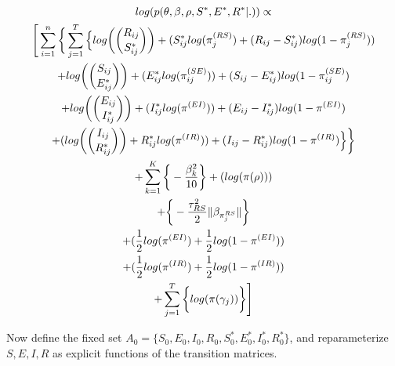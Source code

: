 \documentclass[12pt]{article}
\begin{document}
\begin{center}
\begin{multline}
\displaystyle
log(p(\theta,\beta,\rho,S^*,E^*,R^*|.)) \propto \\
\Bigg[ \sum_{i=1}^n \bigg\{ \sum_{j=1}^T
        \Big\{
            log\bigg(\dbinom{R_{ij}}{S^*_{ij}}\bigg) + (S^*_{ij}log(\pi_j^{(RS)}) + (R_{ij} - S^*_{ij})log(1-\pi_j^{(RS)})) \\
            + log\bigg(\dbinom{S_{ij}}{E^*_{ij}}\bigg) + (E^*_{ij}log(\pi_{ij}^{(SE)})) + (S_{ij} - E^*_{ij})log(1-\pi_{ij}^{(SE)}) \\
            + log\bigg(\dbinom{E_{ij}}{I^*_{ij}}\bigg) + (I^*_{ij}log(\pi^{(EI)})) + (E_{ij} - I^*_{ij})log(1-\pi^{(EI)}) \\
            + (log\bigg(\dbinom{I_{ij}}{R^*_{ij}}\bigg) + R^*_{ij}log(\pi^{(IR)})) + (I_{ij} - R^*_{ij})log(1-\pi^{(IR)}) \Big\}\bigg\} \\
    + \sum_{k = 1}^K\bigg\{-\frac{\beta^2_k}{10}\bigg\}
            + (log(\pi(\rho)))\\
            +  \bigg\{ -\frac{\tau^2_{RS}}{2}\|\beta_{\pi_j^{RS}}\|  \bigg\} \\ 
            + (\frac{1}{2}log(\pi^{(EI)}) + \frac{1}{2}log(1-\pi^{(EI)})) \\
            + (\frac{1}{2}log(\pi^{(IR)}) + \frac{1}{2}log(1-\pi^{(IR)})) \\
            + \sum_{j=1}^{T} \bigg\{ log(\pi(\gamma_j)) \bigg\}\Bigg]\\
\end{multline}
\end{center}

Now define the fixed set $A_0 = \{S_0, E_0, I_0, R_0, S^*_0, E^*_0, I^*_0, R^*_0\}$,
and reparameterize $S, E, I, R$ as explicit functions of the transition matrices. 
\end{document}

